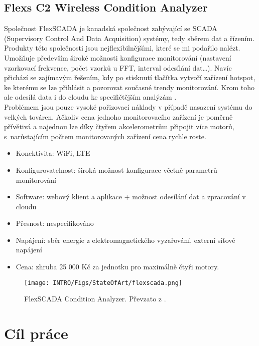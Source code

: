     
    
    \subsection{Flexs C2 Wireless Condition Analyzer}
        Společnost FlexSCADA je kanadská společnost zabývající se SCADA (Supervisory Control And Data Acquisition) systémy, tedy sběrem dat a řízením. Produkty této společnosti jsou nejflexibilnějšími, které se mi podařilo nalézt. Umožňuje především široké možnosti konfigurace monitorování (nastavení vzorkovací frekvence, počet vzorků u FFT, interval odesílání dat\ldots). Navíc přichází se zajímavým řešením, kdy po stisknutí tlačítka vytvoří zařízení hotspot, ke kterému se lze přihlásit a pozorovat současné trendy monitorování. Krom toho ale odesílá data i do cloudu ke specifičtějším analýzám \cite{manufactor:4}.\\
        Problémem jsou pouze vysoké pořizovací náklady v případě nasazení systému do velkých továren. Ačkoliv cena jednoho monitorovacího zařízení je poměrně přívětivá a najednou lze díky čtyřem akcelerometrům připojit více motorů, s~narůstajícím počtem monitorovaných zařízení cena rychle roste.
        \begin{itemize}
            \item Konektivita: WiFi, LTE
            \item Konfigurovatelnost: široká možnost konfigurace včetně parametrů monitorování
            \item Software: webový klient a aplikace + možnost odesílání dat a zpracování v cloudu
            \item Přesnost: nespecifikováno
            \item Napájení: sběr energie z elektromagnetického vyzařování, externí síťové napájení
            \item Cena: zhruba 25 000 Kč za jednotku pro maximálně čtyři motory.
        \end{itemize}{}
        
        \begin{figure} [!h]
                \centering
                \caption{FlexSCADA Condition Analyzer. Převzato z \cite{manufactor:4}.}
                \texttt{[image: INTRO/Figs/StateOfArt/flexscada.png]}
        \end{figure} 


\section{Cíl práce}
    
